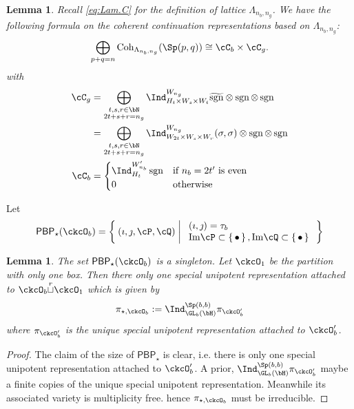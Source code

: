 \documentclass[12pt,a4paper]{amsart}
\def\Im{\operatorname{Im}}
\newcommand{\sgn}{\operatorname{sgn}}
\numberwithin{equation}{section}
\newtheorem{lem}[thm]{Lemma}
\theoremstyle{remark}
\def\Cint#1{\Coh_{[#1]}}
\def\Im{\mathrm{Im}}
\def\Coh{\mathrm{Coh}}
\def\cuprow{{\stackrel{r}{\sqcup}}}
\def\hsgn{\widetilde{\mathrm{sgn}}}
\def\PBP{\mathsf{PBP}}
\begin{document}
\begin{lem}
  Recall \eqref{eq:Lam.C} for the definition of lattice $\Lambda_{n_{b},n_{g}}$.
  We have the following formula on the coherent continuation
  representations based on $\Lambda_{n_{b},n_{g}}$:
  \[
    \bigoplus_{p+q=n} \Coh_{\Lambda_{n_{b}, n_{g}}}(\Sp(p,q)) \cong \cC_{b}\times \cC_{g}.
  \]
  with
  \[
    \begin{split}
      \cC_g %
      &=\bigoplus_{\substack{t,s,r\in\bN\\2t+s+r=n_{g}}} \Ind_{H_{t} \times W_s\times W_t}^{W_{n_{g}}}
       \hsgn \otimes \sgn \otimes \sgn \\
      & =\bigoplus_{\substack{t,s,r\in\bN\\2t+s+r=n_{g}}} \Ind_{W_{2t}\times W_s\times W_r}^{W_{n_{g}}}
      (\sigma,\sigma)\otimes \sgn \otimes \sgn \\
      \cC_b & =
      \begin{cases}
        \Ind_{H_{t}}^{W'_{n_{b}}} \sgn &
        \text{if $n_{b}=2t'$ is even} \\
        0 & \text{otherwise}\\
      \end{cases}\\
    \end{split}
  \]
\end{lem}

Let
\[
  \PBP_{\star}(\ckcO_{b}) = \Set{(\imath,\jmath, \cP,\cQ) | %
    \begin{array}{l}
      (\imath,\jmath) = \tau_{b}\\
      \Im \cP \subset \set{\bullet}, \Im \cQ \subset\set{\bullet
      }\\
    \end{array}
  }
\]

\begin{lem}\label{lem:bp.C*}
  The set $\PBP_{\star}(\ckcO_{b})$ is a singleton.
  Let $\ckcO_{1}$ be the partition with only one box.
  Then  there only one special unipotent representation
  attached to $\ckcO_{b}\cuprow \ckcO_{1}$ which is given by
  \[
    \pi_{\star,\ckcO_{b}}:=
    \Ind_{\GL_{b}(\bH)}^{\Sp(b,b)}\pi_{\ckcO'_{b}}
  \]
  where $\pi_{\ckcO'_{b}}$ is the unique special unipotent representation
  attached
  to $\ckcO'_{b}$.
\end{lem}
\begin{proof}
  The claim of the size of $\PBP_{\star}$ is clear, i.e. there is only one
  special unipotent representation attached to $\ckcO'_{b}$. A prior,
  $\Ind_{\GL_{b}(\bH)}^{\Sp(b,b)}\pi_{\ckcO'_{b}}$ maybe a finite copies of the
  unique special unipotent representation. Meanwhile its associated variety is
  multiplicity free. hence $\pi_{\star,\ckcO_{b}}$ must be irreducible.
\end{proof}
\end{document}
